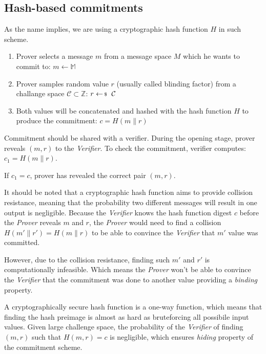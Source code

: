 \documentclass[../lecture-notes-148x210.tex]{subfiles}
\begin{document}
\subsection{Hash-based commitments}

As the name implies, we are using a cryptographic hash function \(H\) in such scheme.

\begin{enumerate}
    \item Prover selects a message $m$ from a message space $M$ which he wants to commit to:
        $m \leftarrow \mathbb{M}$

    \item Prover samples random value $r$ (usually called blinding factor) from a challange space $\mathcal{C} \subset \mathbb{Z}$:
        $r \leftarrowS \mathcal{C}$
    
    \item Both values will be concatenated and hashed with the hash function $H$ to produce the commitment:
        $c = H(m \parallel r)$

\end{enumerate}

Commitment should be shared with a verifier. During the opening stage, prover reveals $(m, r)$ to the \textit{Verifier}. 
To check the commitment, verifier computes: $c_1 = H(m \parallel r)$.

If $c_1 = c$, prover has revealed the correct pair $(m, r)$.

It should be noted that a cryptographic hash function aims to provide collision resistance, 
meaning that the probability two different messages will result in one output is negligible.
Because the \textit{Verifier} knows the hash function digest $c$ before the \textit{Prover} reveals $m$ and $r$, 
the \textit{Prover} would need to find a collision $H(m' \parallel r') = H(m \parallel r)$ to be able to convince the \textit{Verifier}
that $m'$ value was committed.

However, due to the collision resistance, finding such $m'$ and $r'$ is computationally infeasible. Which means the \textit{Prover}
won't be able to convince the \textit{Verifier} that the commitment was done to another value providing a \textit{binding} property.

A cryptographically secure hash function is a one-way function, which means that finding the hash preimage is almost as hard as bruteforcing
all possibile input values. Given large challenge space, the probability of the \textit{Verifier} of finding $(m, r)$ such that
$H(m, r) = c$ is negligible, which ensures \textit{hiding} property of the commitment scheme. 
\end{document}
